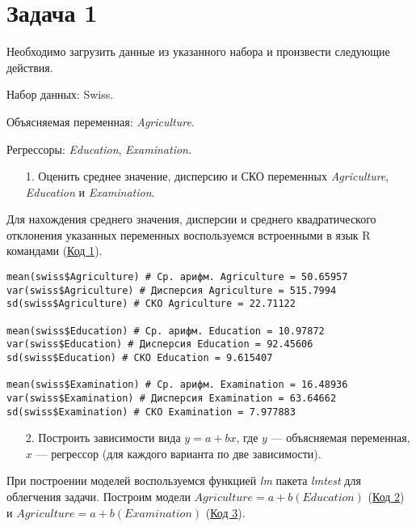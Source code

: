 \justifying

\section{Задача 1}

Необходимо загрузить данные из указанного набора и произвести следующие действия.

Набор данных: Swiss.

Объясняемая переменная: \textit{Agriculture}.

Регрессоры: \textit{Education}, \textit{Examination}.

\begin{enumerate}
    \item[1.] Оценить среднее значение, дисперсию и СКО переменных \textit{Agriculture}, \textit{Education} и \textit{Examination}.
\end{enumerate}

Для нахождения среднего значения, дисперсии и среднего квадратического отклонения указанных переменных воспользуемся встроенными в язык R командами (\hyperref[code:1]{Код 1}).

\begin{code}
\begin{verbatim}
mean(swiss$Agriculture) # Ср. арифм. Agriculture = 50.65957
var(swiss$Agriculture) # Дисперсия Agriculture = 515.7994
sd(swiss$Agriculture) # СКО Agriculture = 22.71122

mean(swiss$Education) # Ср. арифм. Education = 10.97872
var(swiss$Education) # Дисперсия Education = 92.45606
sd(swiss$Education) # СКО Education = 9.615407

mean(swiss$Examination) # Ср. арифм. Examination = 16.48936
var(swiss$Examination) # Дисперсия Examination = 63.64662
sd(swiss$Examination) # СКО Examination = 7.977883
\end{verbatim}
\label{code:1}
\end{code}

\begin{enumerate}
    \item[2.] Построить зависимости вида $y = a + bx$, где $y$ --- объясняемая переменная, $x$ --- регрессор (для каждого варианта по две зависимости).
\end{enumerate}

При построении моделей воспользуемся функцией \textit{lm} пакета \textit{lmtest} для облегчения задачи. Построим модели $\textit{Agriculture} = a + b(\textit{Education})$ (\hyperref[code:2]{Код 2}) и $\textit{Agriculture} = a + b(\textit{Examination})$ (\hyperref[code:3]{Код 3}).


